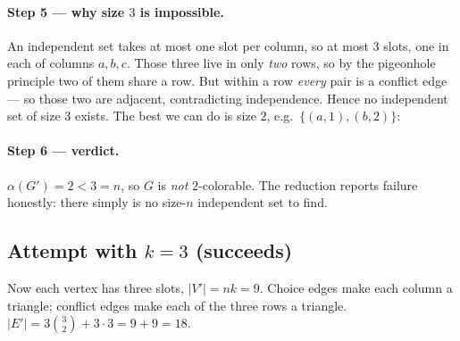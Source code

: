 \documentclass[11pt]{article}
\begin{document}
\paragraph{Step 5 --- why size $3$ is impossible.} An independent set takes at
most one slot per column, so at most $3$ slots, one in each of columns $a,b,c$.
Those three live in only \emph{two} rows, so by the pigeonhole principle two of
them share a row. But within a row \emph{every} pair is a conflict edge --- so
those two are adjacent, contradicting independence. Hence no independent set of
size $3$ exists. The best we can do is size $2$, e.g.\ $\{(a,1),(b,2)\}$:

\begin{center}
\end{center}

\paragraph{Step 6 --- verdict.} $\alpha(G')=2<3=n$, so $G$ is \emph{not}
$2$-colorable. The reduction reports failure honestly: there simply is no
size-$n$ independent set to find.

\subsection{Attempt with $k=3$ (succeeds)}

Now each vertex has three slots, $|V'|=nk=9$. Choice edges make each column a
triangle; conflict edges make each of the three rows a triangle.
$|E'| = 3\binom{3}{2} + 3\cdot 3 = 9 + 9 = 18$.

\begin{center}
\end{center}
\end{document}
